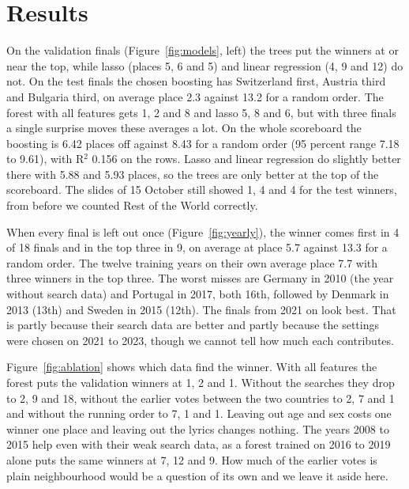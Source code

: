 \section{Results}



On the validation finals (Figure~\ref{fig:models}, left) the trees put the winners at or near the top, while lasso (places 5, 6 and 5) and linear regression (4, 9 and 12) do not. On the test finals the chosen boosting has Switzerland first, Austria third and Bulgaria third, on average place 2.3 against 13.2 for a random order. The forest with all features gets 1, 2 and 8 and lasso 5, 8 and 6, but with three finals a single surprise moves these averages a lot. On the whole scoreboard the boosting is 6.42 places off against 8.43 for a random order (95 percent range 7.18 to 9.61), with R$^2$ 0.156 on the rows. Lasso and linear regression do slightly better there with 5.88 and 5.93 places, so the trees are only better at the top of the scoreboard. The slides of 15 October still showed 1, 4 and 4 for the test winners, from before we counted Rest of the World correctly.



When every final is left out once (Figure~\ref{fig:yearly}), the winner comes first in 4 of 18 finals and in the top three in 9, on average at place 5.7 against 13.3 for a random order. The twelve training years on their own average place 7.7 with three winners in the top three. The worst misses are Germany in 2010 (the year without search data) and Portugal in 2017, both 16th, followed by Denmark in 2013 (13th) and Sweden in 2015 (12th). The finals from 2021 on look best. That is partly because their search data are better and partly because the settings were chosen on 2021 to 2023, though we cannot tell how much each contributes.



Figure~\ref{fig:ablation} shows which data find the winner. With all features the forest puts the validation winners at 1, 2 and 1. Without the searches they drop to 2, 9 and 18, without the earlier votes between the two countries to 2, 7 and 1 and without the running order to 7, 1 and 1. Leaving out age and sex costs one winner one place and leaving out the lyrics changes nothing. The years 2008 to 2015 help even with their weak search data, as a forest trained on 2016 to 2019 alone puts the same winners at 7, 12 and 9. How much of the earlier votes is plain neighbourhood would be a question of its own and we leave it aside here.

